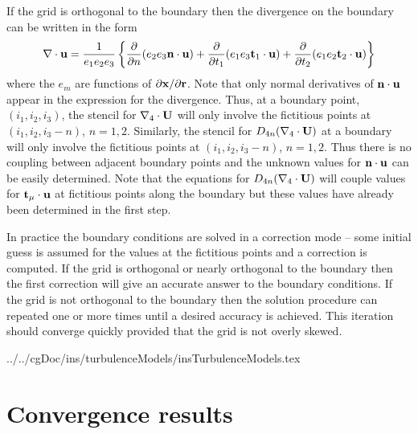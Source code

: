 \documentclass[10pt]{article}
\newcommand{\cgDoc}{../../cgDoc}
\begin{document}
If the grid is orthogonal to the boundary then the divergence on the
boundary can be written in the form
$$
    \nabla\cdot\mathbf{ u} = {1\over e_1 e_2 e_3} \left\{
          {\partial \over \partial n} ( e_2 e_3 \mathbf{ n}\cdot\mathbf{ u} )
        + {\partial \over \partial t_1} ( e_1 e_3 \mathbf{ t}_1 \cdot\mathbf{ u} )
        + {\partial \over \partial t_2} ( e_1 e_2 \mathbf{ t}_2 \cdot\mathbf{ u} )
              \right \}
$$
where the $e_m$ are functions of $\partial \mathbf{ x} / \partial \mathbf{ r}$.
Note that only normal
derivatives of $\mathbf{ n}\cdot\mathbf{ u}$ appear in the expression for the divergence.
Thus, at a boundary point, $(i_1,i_2,i_3)$, the stencil for
$\nabla_4\cdot\mathbf{U}$
will only involve the fictitious points at
$(i_1,i_2,i_3-n)$, $n=1,2$.
Similarly, the stencil for
$D_{4n}(\nabla_4\cdot\mathbf{U})$ at a boundary
will only involve the fictitious points at
$(i_1,i_2,i_3-n)$, $n=1,2$.
Thus there is no coupling between adjacent boundary points and the
unknown values for $\mathbf{ n}\cdot\mathbf{ u}$ can be easily determined.  Note that
the equations for $D_{4n}(\nabla_4\cdot\mathbf{U})$ will couple values for
$\mathbf{ t}_\mu\cdot\mathbf{ u}$ at fictitious points along the boundary
but these values have already been determined in the first step.
 
In practice the boundary conditions are solved in a correction mode --
some initial guess is assumed for the values at the fictitious points
and a correction is computed.  If the grid is orthogonal or nearly
orthogonal to the boundary then the first correction will give an
accurate answer to the boundary conditions.  If the grid is not
orthogonal to the boundary then the solution procedure can repeated
one or more times until a desired accuracy is achieved. This
iteration should converge quickly provided that the grid is not overly
skewed.

\clearpage
 \cgDoc/ins/turbulenceModels/insTurbulenceModels.tex

\clearpage



\clearpage



\clearpage
\section{Convergence results}
\end{document}
